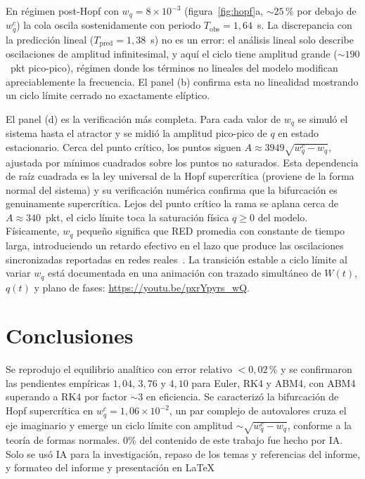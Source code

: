 \documentclass[10pt,a4paper]{article}
\begin{document}
En régimen post-Hopf con $w_q=8\times 10^{-3}$
(figura~\ref{fig:hopf}a, $\sim 25\,\%$ por debajo de $w_q^c$) la cola
oscila sostenidamente con periodo $T_{\text{obs}}=1{,}64$~s. La
discrepancia con la predicción lineal ($T_{\text{pred}}=1{,}38$~s) no
es un error: el análisis lineal solo describe oscilaciones de amplitud
infinitesimal, y aquí el ciclo tiene amplitud grande ($\sim 190$~pkt
pico-pico), régimen donde los términos no lineales del modelo
modifican apreciablemente la frecuencia. El panel (b) confirma esta no
linealidad mostrando un ciclo límite cerrado no exactamente elíptico.

El panel (d) es la verificación más completa. Para cada valor de $w_q$
se simuló el sistema hasta el atractor y se midió la amplitud
pico-pico de $q$ en estado estacionario. Cerca del punto crítico, los
puntos siguen $A\approx 3949\sqrt{w_q^c-w_q}$, ajustada por mínimos
cuadrados sobre los puntos no saturados. Esta dependencia de raíz
cuadrada es la ley universal de la Hopf supercrítica (proviene de la
forma normal del sistema) y su verificación numérica confirma que la
bifurcación es genuinamente supercrítica. Lejos del punto crítico la
rama se aplana cerca de $A\approx 340$~pkt, el ciclo límite toca la
saturación física $q\ge 0$ del modelo. Físicamente, $w_q$ pequeño
significa que RED promedia con constante de tiempo larga, introduciendo
un retardo efectivo en el lazo que produce las oscilaciones
sincronizadas reportadas en redes reales~\cite{floyd1993}. La
transición estable a ciclo límite al variar $w_q$ está documentada
en una animación con trazado simultáneo de $W(t)$, $q(t)$ y plano
de fases: \url{https://youtu.be/pxrYpyrs_wQ}.

\section{Conclusiones}
\label{sec:conclusiones}

Se reprodujo el equilibrio analítico con error relativo $<0{,}02\,\%$
y se confirmaron las pendientes empíricas $1{,}04$, $3{,}76$ y $4{,}10$
para Euler, RK4 y ABM4, con ABM4 superando a RK4 por factor $\sim 3$ en
eficiencia. Se caracterizó la bifurcación de Hopf supercrítica en
$w_q^c=1{,}06\times 10^{-2}$, un par complejo de autovalores cruza el
eje imaginario y emerge un ciclo límite con amplitud
$\sim\sqrt{w_q^c-w_q}$, conforme a la teoría de formas normales. 0\% del
contenido de este trabajo fue hecho por IA. Solo se usó IA para la investigación,
repaso de los temas y referencias del informe, y formateo del informe y presentación
en \LaTeX
\end{document}
